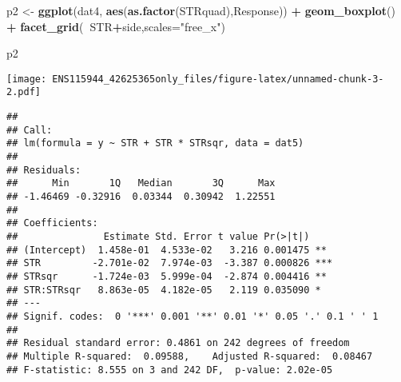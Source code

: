 \documentclass[
]{article}
\newenvironment{Shaded}{\begin{snugshade}}{\end{snugshade}}
\newcommand{\DataTypeTok}[1]{\textcolor[rgb]{0.13,0.29,0.53}{#1}}
\newcommand{\KeywordTok}[1]{\textcolor[rgb]{0.13,0.29,0.53}{\textbf{#1}}}
\newcommand{\NormalTok}[1]{#1}
\newcommand{\OperatorTok}[1]{\textcolor[rgb]{0.81,0.36,0.00}{\textbf{#1}}}
\newcommand{\OtherTok}[1]{\textcolor[rgb]{0.56,0.35,0.01}{#1}}
\newcommand{\StringTok}[1]{\textcolor[rgb]{0.31,0.60,0.02}{#1}}
\begin{document}
\begin{Shaded}
\begin{Highlighting}[]
\NormalTok{p2 <-}\StringTok{ }\KeywordTok{ggplot}\NormalTok{(dat4, }\KeywordTok{aes}\NormalTok{(}\KeywordTok{as.factor}\NormalTok{(STRquad),Response)) }\OperatorTok{+}\StringTok{ }\KeywordTok{geom_boxplot}\NormalTok{() }\OperatorTok{+}\StringTok{ }\KeywordTok{facet_grid}\NormalTok{(}\OperatorTok{~}\NormalTok{STR}\OperatorTok{+}\NormalTok{side,}\DataTypeTok{scales=}\StringTok{"free_x"}\NormalTok{)}

\NormalTok{p2}
\end{Highlighting}
\end{Shaded}

\texttt{[image: ENS115944\_42625365only\_files/figure-latex/unnamed-chunk-3-2.pdf]}

\begin{Shaded}
\end{Shaded}

\begin{verbatim}
## 
## Call:
## lm(formula = y ~ STR + STR * STRsqr, data = dat5)
## 
## Residuals:
##      Min       1Q   Median       3Q      Max 
## -1.46469 -0.32916  0.03344  0.30942  1.22551 
## 
## Coefficients:
##               Estimate Std. Error t value Pr(>|t|)    
## (Intercept)  1.458e-01  4.533e-02   3.216 0.001475 ** 
## STR         -2.701e-02  7.974e-03  -3.387 0.000826 ***
## STRsqr      -1.724e-03  5.999e-04  -2.874 0.004416 ** 
## STR:STRsqr   8.863e-05  4.182e-05   2.119 0.035090 *  
## ---
## Signif. codes:  0 '***' 0.001 '**' 0.01 '*' 0.05 '.' 0.1 ' ' 1
## 
## Residual standard error: 0.4861 on 242 degrees of freedom
## Multiple R-squared:  0.09588,    Adjusted R-squared:  0.08467 
## F-statistic: 8.555 on 3 and 242 DF,  p-value: 2.02e-05
\end{verbatim}
\end{document}
